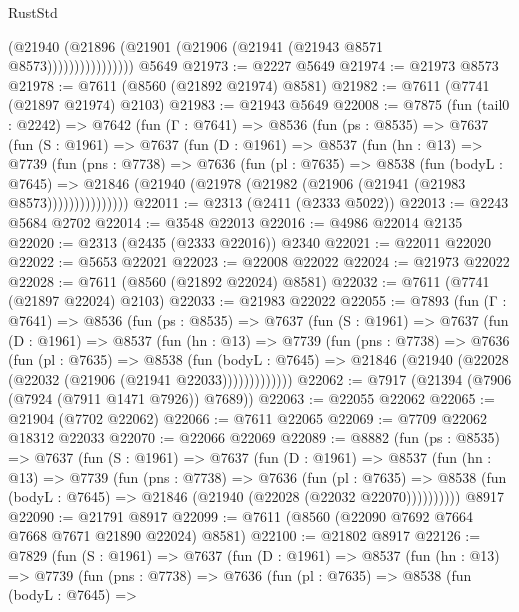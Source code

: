 \begin{lexlean}{RustStd}
\begin{coremodule}
{\begin{coremodule}
{{{{{{{{{{{{{{{{{{{{{{{{{{{{{{{{{{                        (@21940 (@21896 (@21901 (@21906 (@21941 (@21943 @8571 @8573))))))))))))))))
    @5649
@21973 := @2227 @5649
@21974 := @21973 @8573
@21978 := @7611 (@8560 (@21892 @21974) @8581)
@21982 := @7611 (@7741 (@21897 @21974) @2103)
@21983 := @21943 @5649
@22008 := @7875
    (fun (tail0 : @2242) =>
    @7642
      (fun (Γ : @7641) =>
      @8536
        (fun (ps : @8535) =>
        @7637
          (fun (S : @1961) =>
          @7637
            (fun (D : @1961) =>
            @8537
              (fun (hn : @13) =>
              @7739
                (fun (pns : @7738) =>
                @7636
                  (fun (pl : @7635) =>
                  @8538
                    (fun (bodyL : @7645) =>
                    @21846 (@21940 (@21978 (@21982 (@21906 (@21941 (@21983 @8573)))))))))))))))
@22011 := @2313 (@2411 (@2333 @5022))
@22013 := @2243 @5684 @2702
@22014 := @3548 @22013
@22016 := @4986 @22014 @2135
@22020 := @2313 (@2435 (@2333 @22016)) @2340
@22021 := @22011 @22020
@22022 := @5653 @22021
@22023 := @22008 @22022
@22024 := @21973 @22022
@22028 := @7611 (@8560 (@21892 @22024) @8581)
@22032 := @7611 (@7741 (@21897 @22024) @2103)
@22033 := @21983 @22022
@22055 := @7893
    (fun (Γ : @7641) =>
    @8536
      (fun (ps : @8535) =>
      @7637
        (fun (S : @1961) =>
        @7637
          (fun (D : @1961) =>
          @8537
            (fun (hn : @13) =>
            @7739
              (fun (pns : @7738) =>
              @7636
                (fun (pl : @7635) =>
                @8538
                  (fun (bodyL : @7645) =>
                  @21846 (@21940 (@22028 (@22032 (@21906 (@21941 @22033)))))))))))))
@22062 := @7917 (@21394 (@7906 (@7924 (@7911 @1471 @7926)) @7689))
@22063 := @22055 @22062
@22065 := @21904 (@7702 @22062)
@22066 := @7611 @22065
@22069 := @7709 @22062 @18312 @22033
@22070 := @22066 @22069
@22089 := @8882
    (fun (ps : @8535) =>
    @7637
      (fun (S : @1961) =>
      @7637
        (fun (D : @1961) =>
        @8537
          (fun (hn : @13) =>
          @7739
            (fun (pns : @7738) =>
            @7636
              (fun (pl : @7635) =>
              @8538 (fun (bodyL : @7645) => @21846 (@21940 (@22028 (@22032 @22070))))))))))
    @8917
@22090 := @21791 @8917
@22099 := @7611 (@8560 (@22090 @7692 @7664 @7668 @7671 @21890 @22024) @8581)
@22100 := @21802 @8917
@22126 := @7829
    (fun (S : @1961) =>
    @7637
      (fun (D : @1961) =>
      @8537
        (fun (hn : @13) =>
        @7739
          (fun (pns : @7738) =>
          @7636
            (fun (pl : @7635) =>
            @8538
              (fun (bodyL : @7645) =>
}}}}}}}}}}}}}}}}}}}}}}}}}}}}}}}}}}
\end{coremodule}}
\end{coremodule}
\end{lexlean}
